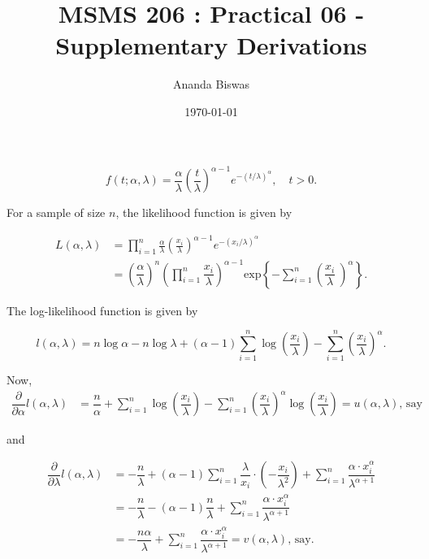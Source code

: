 \documentclass[11pt, a4paper]{article}\usepackage[]{graphicx}\usepackage[]{xcolor}
\title{MSMS 206 : Practical 06 - Supplementary Derivations}
\author{Ananda Biswas}
\date{\today}
\begin{document}
\maketitle

\faArrowAltCircleRight[regular]

\[
f(t; \alpha, \lambda) = \frac{\alpha}{\lambda} \left( \frac{t}{\lambda} \right)^{\alpha - 1} e^{-(t/\lambda)^\alpha}, \quad t > 0.
\]


For a sample of size $n$, the likelihood function is given by

\begin{align*}
L(\alpha, \lambda) &= \prod \limits_{i = 1}^{n} \frac{\alpha}{\lambda} \left( \frac{x_i}{\lambda} \right)^{\alpha - 1} e^{-(x_i / \lambda)^\alpha} \\
&= \left( \dfrac{\alpha}{\lambda} \right)^n \left( \prod \limits_{i = 1}^{n}  \dfrac{x_i}{\lambda} \right)^{\alpha - 1} \text{exp}\left\{- \sum \limits_{i = 1}^{n} \left( \dfrac{x_i}{\lambda}\ \right)^{\alpha} \right\}.
\end{align*}

\vspace{0.5cm}

The log-likelihood function is given by

$$l(\alpha, \lambda) = n \log \alpha - n \log \lambda + (\alpha - 1) \sum_{i=1}^{n} \log \left( \frac{x_i}{\lambda} \right) - \sum_{i=1}^{n} \left( \frac{x_i}{\lambda} \right)^{\alpha}.$$

Now, 
\begin{align*}
\dfrac{\partial}{\partial \alpha} l(\alpha, \lambda) &= \dfrac{n}{\alpha} + \sum \limits_{i=1}^{n} \log \left( \dfrac{x_i}{\lambda} \right) - \sum \limits_{i=1}^{n} \left( \dfrac{x_i}{\lambda} \right)^{\alpha} \log \left( \dfrac{x_i}{\lambda} \right) = u(\alpha, \lambda) \text{, say}
\end{align*}

and

\begin{align*}
\dfrac{\partial}{\partial \lambda} l(\alpha, \lambda) &= -\dfrac{n}{\lambda} + (\alpha - 1) \sum \limits_{i=1}^{n} \dfrac{\lambda}{x_i} \cdot \left( -\dfrac{x_i}{\lambda^2} \right) + \sum \limits_{i=1}^{n} \dfrac{\alpha \cdot x_i^{\alpha}}{\lambda^{\alpha + 1}}\\[0.3cm]
&= -\dfrac{n}{\lambda} - (\alpha - 1) \dfrac{n}{\lambda} + \sum \limits_{i=1}^{n} \dfrac{\alpha \cdot x_i^{\alpha}}{\lambda^{\alpha + 1}}\\[0.3cm]
&= -\dfrac{n \alpha}{\lambda} + \sum \limits_{i=1}^{n} \dfrac{\alpha \cdot x_i^{\alpha}}{\lambda^{\alpha + 1}} = v(\alpha, \lambda) \text{, say}.
\end{align*}
\end{document}
